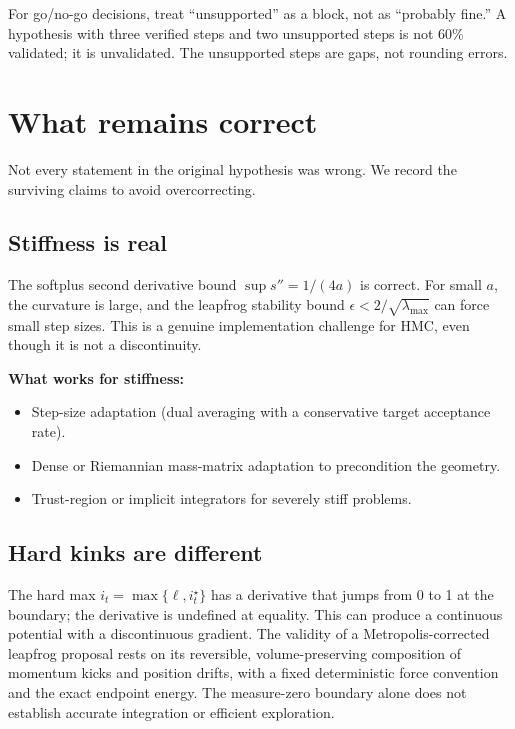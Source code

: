 For go/no-go decisions, treat ``unsupported'' as a block, not as ``probably fine.'' A hypothesis with three verified steps and two unsupported steps is not 60\% validated; it is unvalidated. The unsupported steps are gaps, not rounding errors.


\section{What remains correct}

Not every statement in the original hypothesis was wrong. We record the surviving claims to avoid overcorrecting.

\subsection{Stiffness is real}

The softplus second derivative bound $\sup s'' = 1/(4a)$ is correct. For small $a$, the curvature is large, and the leapfrog stability bound $\epsilon < 2/\sqrt{\lambda_{\max}}$ can force small step sizes. This is a genuine implementation challenge for HMC, even though it is not a discontinuity.

\textbf{What works for stiffness:}
\begin{itemize}
\item Step-size adaptation (dual averaging with a conservative target acceptance rate).
\item Dense or Riemannian mass-matrix adaptation to precondition the geometry.
\item Trust-region or implicit integrators for severely stiff problems.
\end{itemize}

\subsection{Hard kinks are different}

The hard max $i_t = \max\{\ell, i_t^\star\}$ has a derivative that jumps from
0 to 1 at the boundary; the derivative is undefined at equality. This can
produce a continuous potential with a discontinuous gradient. The validity
of a Metropolis-corrected leapfrog proposal rests on its reversible,
volume-preserving composition of momentum kicks and position drifts, with a
fixed deterministic force convention and the exact endpoint energy. The
measure-zero boundary alone does not establish accurate integration or
efficient exploration.

